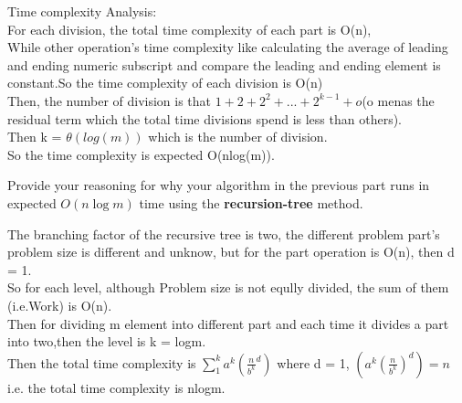 \begin{parts}
\begin{subparts}
\begin{solution}
    Time complexity Analysis:\\
    For each division, the total time complexity of each part is O(n),\\
    While other operation's time complexity like calculating the average of leading and ending numeric subscript and compare the leading and ending element is constant.So the time complexity of each division is O(n)\\
    Then, the number of division is that $1+2+2^{2}+...+ 2^{k-1} + o$(o menas the residual term which the total time divisions spend is less than others).\\
    Then k = $\theta(log(m))$ which is the number of division.\\
    So the time complexity is expected O(nlog(m)).\\
    \end{solution}

    \newpage
    
    \subpart[2] Provide your reasoning for why your algorithm in the previous part runs in expected $O(n\log m)$ time using the \textbf{recursion-tree} method.
    \begin{solution}
    The branching factor of the recursive tree is two, the different problem part's problem size is different and unknow, but for the part operation is O(n), then d = 1.\\
    So for each level, although Problem size is not eqully divided, the sum of them (i.e.Work) is O(n).\\
    Then for dividing m element into different part and each time it divides a part into two,then the level is k = logm.\\
    Then the total time complexity is $\sum_{1}^{k}a^{k}(\frac{n}{b^{k}}^{d})$ where d = 1, $(a^{k}(\frac{n}{b^{k}})^{d}) = n$\\
    i.e. the total time complexity is nlogm.\\
    \end{solution}
    
\end{subparts}

\end{parts}